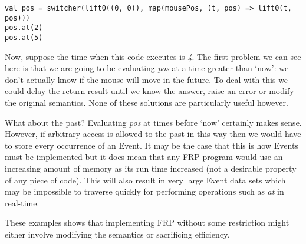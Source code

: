 \begin{verbatim}
val pos = switcher(lift0((0, 0)), map(mousePos, (t, pos) => lift0(t, pos)))
pos.at(2)
pos.at(5)
\end{verbatim}    

      Now, suppose the time when this code executes is \emph{4}. The first problem we can see here
      is that we are going to be evaluating \emph{pos} at a time greater than `now': we don't
      actually know if the mouse will move in the future. To deal with this we could delay the return
      result until we know the answer, raise an error or modify the original semantics. None of these solutions are
      particularly useful however.
      
      What about the past? Evaluating \emph{pos} at times before `now' certainly makes sense. However, if arbitrary
      access is allowed to the past in this way then we would have to store every occurrence
      of an Event. It may be the case that this is how Events must be implemented but it does
      mean that any FRP program would use an increasing amount of memory as its run time increased (not a 
      desirable property of any piece of code). This will also result in very large Event data sets which
      may be impossible to traverse quickly for performing operations such as \emph{at} in real-time.
      
      These examples shows that implementing FRP without some restriction might either involve modifying the
      semantics or sacrificing efficiency.
